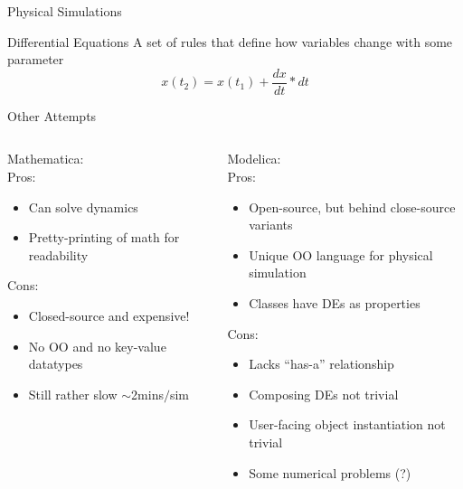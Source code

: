 \documentclass[mathserif]{beamer}
\begin{document}
\begin{frame}{Physical Simulations}
  \begin{block}{Differential Equations}
    A set of rules that define how variables change with some parameter
    \begin{equation*}
      x(t_2) = x(t_1) + \frac{dx}{dt}*dt
    \end{equation*}
  \end{block}
\end{frame}

\begin{frame}{Other Attempts}
  \begin{columns}
    \begin{column}{0.49\linewidth}
      Mathematica:\\
      Pros:
      \begin{itemize}
        \item Can solve dynamics
        \item Pretty-printing of math for readability
      \end{itemize}
      Cons:
      \begin{itemize}
        \item Closed-source and expensive!
        \item No OO and no key-value datatypes
        \item Still rather slow $\sim$2mins$/$sim
      \end{itemize}
    \end{column}
    \begin{column}{0.49\linewidth}
      Modelica:\\
      Pros:
      \begin{itemize}
        \item Open-source, but behind close-source variants
        \item Unique OO language for physical simulation
        \item Classes have DEs as properties
      \end{itemize}
      Cons:
      \begin{itemize}
        \item Lacks ``has-a'' relationship
        \item Composing DEs not trivial
        \item User-facing object instantiation not trivial
        \item Some numerical problems (?)
      \end{itemize}
    \end{column}
  \end{columns}
\end{frame}
\end{document}
